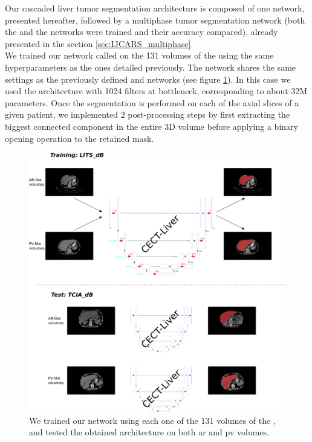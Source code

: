 Our cascaded liver tumor segmentation architecture is composed of one  network, presented hereafter, followed by a multiphase tumor segmentation network (both the  and the  networks were trained and their accuracy compared), already presented in the section \ref{sec:IJCARS_multiphase}. \\
We trained our network called  on the 131 volumes of the
\textbf{} using the same hyperparameters as the ones detailed
previously. The network shares the same settings as the previously defined  and  networks (see figure \ref{fig:CECTliverDetails}). In this case we used the architecture with 1024 filters at bottleneck, corresponding to about 32M parameters. Once the segmentation is performed on each of the axial slices of a given patient, we implemented 2 post-processing steps by first extracting the biggest connected component in the entire 3D volume before applying a binary opening operation to the retained mask.
\begin{figure}[!ht]
	\centering
	\includegraphics[width=\linewidth]{../Contributions/images/CECT_liver_details}
	\caption{We trained our network using each one of the 131 volumes of the \textbf{}, and tested the obtained architecture on both \ac{ar} and \ac{pv} \textbf{} volumes. 
	}
	\label{fig:CECTliverDetails}
\end{figure}

